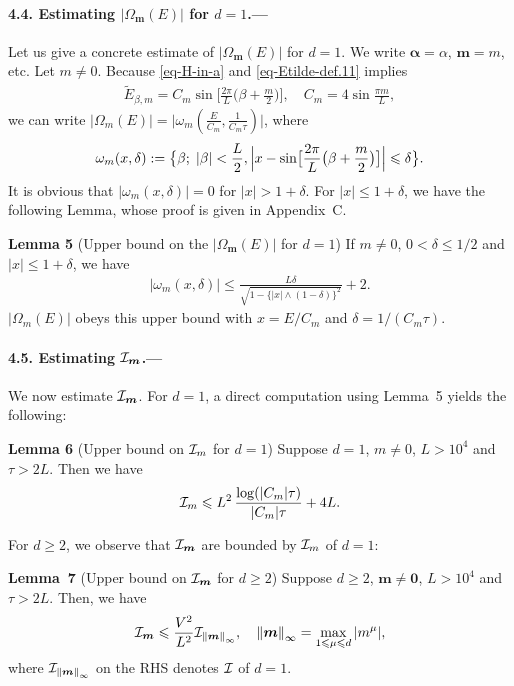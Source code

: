 \documentclass[aps,prl,superscriptaddress,reprint]{revtex4-2}
\newcommand{\se}[1]{\paragraph{#1.---}}
\newcommand{\bfthm}[1]{\noindent\textbf{#1}}
\theoremstyle{definition}
\newcommand{\abs}[1]{{\left\vert #1 \right\vert}}
\newcommand{\bigabs}[1]{{\bigl | #1 \bigr |}}
\newcommand{\Bigabs}[1]{{\Bigl | #1 \Bigr |}}
\newcommand{\bigparen}[1]{\bigl({#1}\bigr)}
\newcommand{\bigbrac}[1]{\bigl\{{#1}\bigr\}}
\newcommand{\bigbrak}[1]{\bigl[{#1}\bigr]}
\newcommand{\II}{{\cal I}}
\newcommand{\ti}{\tilde}
\newcommand{\ta}{\tau}
\renewcommand{\a}{\alpha}
\renewcommand{\b}{\beta}
\renewcommand{\d}{\delta}
\newcommand{\m}{\mu}
\newcommand{\om}{\omega}
\newcommand{\Om}{\Omega}
\newcommand{\f}{\frac}
\newcommand{\q}{\quad}
\newcommand{\ve}[1]{\boldsymbol{#1}}
\newcommand{\we}{\wedge}
\newcommand{\norm}[1]{\left\|#1\right\|}
\newcommand{\norminf}[1]{\left\|#1\right\|_\infty}
\renewcommand{\geq}{\geqslant}
\renewcommand{\le}{\leqslant}
\renewcommand{\leq}{\leqslant}
\renewcommand{\aa}{{\ve \a}}
\newcommand{\mm}{{\ve m}}
\newcommand{\zz}{{\ve 0}}
\begin{document}
\se{4.4. Estimating $\abs{\Om_\mm(E)}$ for $d=1$}
Let us give a concrete estimate of
$\abs{\Om_\mm(E)}$ for $d=1$.
We write $\aa=\a$, $\mm=m$, etc.
Let $m\ne0$.
Because \eqref{eq-H-in-a}
and \eqref{eq-Etilde-def.11} implies
\begin{align}
\ti E_{\b,m}
=C_m \sin\bigbrak{\f{2\pi}{L} \bigparen{\b+\f m2}},
\q C_m=4\sin\f{\pi m}{L},
\label{eq-tiE}
\end{align}
we can write
$\abs{\Om_m(E)}=\bigabs{\om_m(\f E{C_m},\f1{C_m\ta})}$,
where
\begin{align}
  \om_m(x,\d):=\bigbrac{\b;\; \abs\b<\f L2,
  \Bigabs{x-\sin\bigbrak{\f{2\pi}{L}\bigparen{\b+\f m2}} }
  \le \d }.
  \label{eq-om}
\end{align}
It is obvious that $\abs{\om_m(x,\d)}=0$
for $\abs x> 1+\d$.
For  $|x| \leq 1 + \d$, we have the following Lemma,
whose proof is given in Appendix~C.

\smallskip

\bfthm{Lemma 5} (Upper bound on the $\abs{\Om_\mm(E)}$ for $d=1$)
If $m\ne0$, $0<\d \le1/2$ and $\abs x\le 1+\d$, we have
\begin{align}
  	\abs{\om_m(x,\d)}
  	\le
  	\f{L\d}{\sqrt{1-\{\abs x\we (1-\d)\}^2}}+2 .
  	\label{eq-DOS}
\end{align}
$\abs{ \Om_m(E) }$ obeys this upper bound with
$x=E/C_m$ and $\d =1/(C_m\ta)$.

\smallskip


\se{4.5. Estimating $\II_\mm$}

We now estimate $\II_\mm$.
For $d=1$, a direct computation using Lemma~5 yields the following:

\smallskip

\bfthm{Lemma 6} (Upper bound on $\II_m$ for $d=1$)
Suppose $d=1$,  $m\ne0$, $L>10^4$ and $\ta>2L$. Then we have
\begin{align}
  	\II_m\le
  	L^2 \, \f{\log (\abs{C_m}\ta)}
  	{\abs{C_m}\ta} +4L.
\end{align}

\smallskip

For $d \geq 2$, we observe that
$\II_\mm$ are bounded by $\II_m$ of $d=1$:


\medskip

\bfthm{Lemma~7} (Upper bound on $\II_\mm$ for $d \geq 2$)
Suppose $d \geq 2$, $\mm\ne\zz$, $L>10^4$ and $\ta>2L$. Then, we have
\begin{align}
	\II_\mm
	\leq \f{V^2}{L^2} \II_{\norm \mm_\infty},
	\quad \norminf\mm = \max_{1\le\m\le d} \abs{m^\m},
	\label{eq-Imd>2-by-d=1}
\end{align}
where $\II_{\norm \mm_\infty}$ on the RHS denotes $\II$ of $d=1$.
\end{document}
